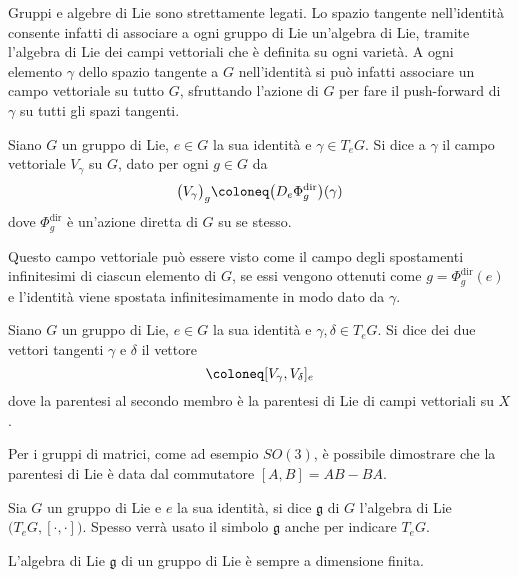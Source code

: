 Gruppi e algebre di Lie sono strettamente legati. Lo spazio tangente nell'identità consente infatti di associare a ogni gruppo di Lie un'algebra di Lie, tramite l'algebra di Lie dei campi vettoriali che è definita su ogni varietà. A ogni elemento $\gamma$ dello spazio tangente a $G$ nell'identità si può infatti associare un campo vettoriale su tutto $G$, sfruttando l'azione di $G$ per fare il push-forward di $\gamma$ su tutti gli spazi tangenti.
\begin{definition}
  Siano $G$ un gruppo di Lie, $e \in G$ la sua identità e $\gamma \in T_e G$. Si dice  a $\gamma$ il campo vettoriale $V_\gamma$ su $G$, dato per ogni $g \in G$ da \begin{equation}
  \big(V_\gamma\big)_g \defeq \big(D_e \Phi^{\text{dir}}_g\big) (\gamma)
  \end{equation} 
  dove $\Phi^{\text{dir}}_g$ è un'azione diretta di $G$ su se stesso.
\end{definition}
\begin{remark}
  Questo campo vettoriale può essere visto come il campo degli spostamenti infinitesimi di ciascun elemento di $G$, se essi vengono ottenuti come $g=\Phi^{\text{dir}}_g(e)$ e l'identità viene spostata infinitesimamente in modo dato da $\gamma$.
\end{remark}
\begin{definition}
  Siano $G$ un gruppo di Lie, $e \in G$ la sua identità e $\gamma, \delta \in T_e G$. Si dice  dei due vettori tangenti $\gamma$ e $\delta$ il vettore \begin{equation}
  [\gamma,\delta] \defeq [V_{\gamma}, V_{\delta}]_e
  \end{equation} 
  dove la parentesi al secondo membro è la parentesi di Lie di campi vettoriali su $X$.
\end{definition}
\begin{remark} \label{rem:matrixComm}
  Per i gruppi di matrici, come ad esempio $SO(3)$, è possibile dimostrare che la parentesi di Lie è data dal commutatore $[A,B] = AB - BA$.
\end{remark}
\begin{definition}
  Sia $G$ un gruppo di Lie e $e$ la sua identità, si dice  $\mathfrak{g}$ di $G$ l'algebra di Lie $\big(T_e G, [\cdot ,\cdot ]\big)$. Spesso verrà usato il simbolo $\mathfrak{g}$ anche per indicare $T_e G$.
\end{definition}

\begin{theorem}
  L'algebra di Lie $\mathfrak{g}$ di un gruppo di Lie è sempre a dimensione finita.
\end{theorem}

